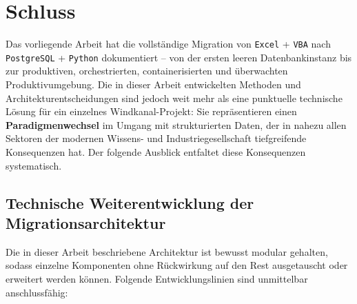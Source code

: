 ﻿\documentclass[12pt,a4paper]{report}
\theoremstyle{definition}
\theoremstyle{remark}
\newcommand{\excel}{\texttt{Excel}}
\newcommand{\vba}{\texttt{VBA}}
\newcommand{\pg}{\texttt{PostgreSQL}}
\newcommand{\py}{\texttt{Python}}
\begin{document}
\chapter{Schluss}
\label{sec:final}

Das vorliegende Arbeit hat die vollständige Migration von \excel{} + \vba{}
nach \pg{} + \py{} dokumentiert -- von der ersten leeren Datenbankinstanz
bis zur produktiven, orchestrierten, containerisierten und überwachten
Produktivumgebung. Die in dieser Arbeit entwickelten Methoden und
Architekturentscheidungen sind jedoch weit mehr als eine punktuelle
technische Lösung für ein einzelnes Windkanal-Projekt: Sie
repräsentieren einen \textbf{Paradigmenwechsel} im Umgang mit
strukturierten Daten, der in nahezu allen Sektoren der modernen
Wissens- und Industriegesellschaft tiefgreifende Konsequenzen hat.
Der folgende Ausblick entfaltet diese Konsequenzen systematisch.

\section{Technische Weiterentwicklung der Migrationsarchitektur}

Die in dieser Arbeit beschriebene Architektur ist bewusst modular
gehalten, sodass einzelne Komponenten ohne Rückwirkung auf den Rest
ausgetauscht oder erweitert werden können.
Folgende Entwicklungslinien sind unmittelbar anschlussfähig:
\end{document}
